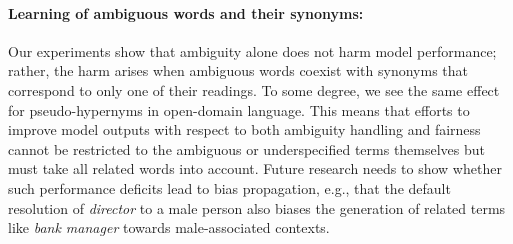 \documentclass[final]{clv2025}
\begin{document}
\paragraph{Learning of ambiguous words and their synonyms:} Our experiments show that ambiguity alone does not harm model performance; rather, the harm arises when ambiguous words coexist with synonyms that correspond to only one of their readings. To some degree, we see the same effect for pseudo-hypernyms in open-domain language. This means that efforts to improve model outputs with respect to both ambiguity handling and fairness cannot be restricted to the ambiguous or underspecified terms themselves but must take all related words into account. Future research needs to show whether such performance deficits lead to bias propagation, e.g., that the default resolution of \emph{director} to a male person also biases the generation of related terms like \emph{bank manager} towards male-associated contexts.
\end{document}
